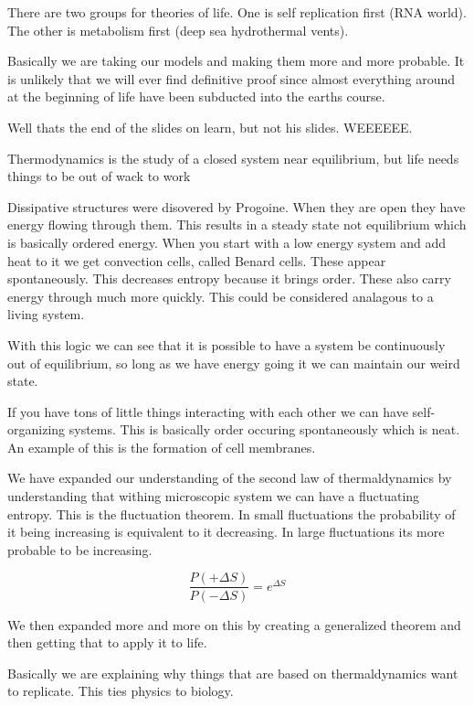 \documentclass{article}
\begin{document}

There are two groups for theories of life. One is self replication first (RNA world). The other is metabolism first (deep sea hydrothermal vents).


Basically we are taking our models and making them more and more probable. It is unlikely that we will ever find definitive proof since almost everything around at the beginning of life have been subducted into the earths course.


Well thats the end of the slides on learn, but not his slides. WEEEEEE.

Thermodynamics is the study of a closed system near equilibrium, but life needs things to be out of wack to work

Dissipative structures were disovered by Progoine. When they are open they have energy flowing through them. This results in a steady state not equilibrium which is basically ordered energy. When you start with a low energy system and add heat to it we get convection cells, called Benard cells. These appear spontaneously. This decreases entropy because it brings order. These also carry energy through much more quickly. This could be considered analagous to a living system.

With this logic we can see that it is possible to have a system be continuously out of equilibrium, so long as we have energy going it we can maintain our weird state.

If you have tons of little things interacting with each other we can have self-organizing systems. This is basically order occuring spontaneously which is neat. An example of this is the formation of cell membranes.

We have expanded our understanding of the second law of thermaldynamics by understanding that withing microscopic system we can have a fluctuating entropy. This is the fluctuation theorem. In small fluctuations the probability of it being increasing is equivalent to it decreasing. In large fluctuations its more probable to be increasing.

\begin{equation}
	\frac{P(+\Delta S)}{P(-\Delta S)} = e^{\Delta S}
\end{equation}

We then expanded more and more on this by creating a generalized theorem and then getting that to apply it to life.


Basically we are explaining why things that are based on thermaldynamics want to replicate. This ties physics to biology.
\end{document}
